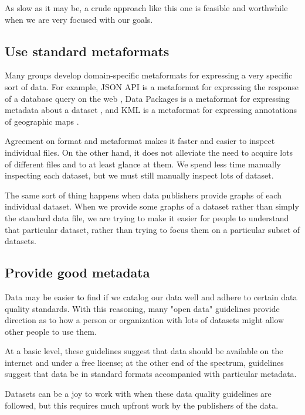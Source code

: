 \documentclass{acm_proc_article-sp}
\begin{document}
As slow as it may be, a crude approach like this one is feasible and
worthwhile when we are very focused with our goals.

\subsection{Use standard metaformats}
Many groups develop domain-specific metaformats for expressing a very specific
sort of data. For example, JSON API is a metaformat for expressing the
response of a database query on the web \cite{jsonapi}, Data Packages is a
metaformat for expressing metadata about a dataset \cite{datapackages},
and KML is a metaformat for expressing annotations of geographic maps \citep{kml}.

Agreement on format and metaformat makes it faster and easier to inspect
individual files. On the other hand, it does not alleviate the
need to acquire lots of different files and to at least glance at them.
We spend less time manually inspecting each dataset, but we must still
manually inspect lots of dataset.

The same sort of thing happens when data publishers provide graphs of
each individual dataset. When we provide some graphs of a dataset
rather than simply the standard data file, we are trying to make it easier for
people to understand that particular dataset, rather than trying to focus
them on a particular subset of datasets.

\subsection{Provide good metadata} \label{guidelines}
Data may be easier to find if we catalog our data well and adhere to
certain data quality standards. With this reasoning,
many "open data" guidelines provide direction as to how a person
or organization with lots of datasets might allow other people
to use them.
\cite{open-data-census,fivestars,sunlight,sebastopol,odi}

At a basic level, these guidelines suggest that data should
be available on the internet and under a free license; at the other
end of the spectrum, guidelines suggest that data be in standard
formats accompanied with particular metadata.

Datasets can be a joy to work with when these data quality guidelines
are followed, but this requires much upfront work by the publishers
of the data.
\end{document}
